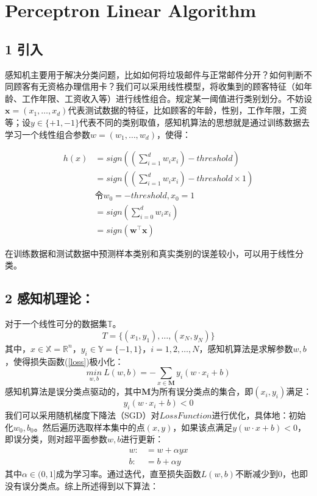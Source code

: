 \documentclass[twoside]{article}
\newcommand{\bx}{\mathbf{x}}
\begin{document}
\section*{Perceptron Linear Algorithm}
\subsection*{1 引入}
感知机主要用于解决分类问题，比如如何将垃圾邮件与正常邮件分开？如何判断不同顾客有无资格办理信用卡？我们可以采用线性模型，将收集到的顾客特征（如年龄、工作年限、工资收入等）进行线性组合。规定某一阈值进行类别划分。不妨设$\bx=(x_1,\ldots,x_d)$代表测试数据的特征，比如顾客的年龄，性别，工作年限，工资等；设$y \in \{+1,-1\}$代表不同的类别取值，感知机算法的思想就是通过训练数据去学习一个线性组合参数$w=(w_1,\ldots,w_d)$，使得：

\begin{equation*}
    \begin{aligned}
        h(x)&=sign\left(\left(\sum_{i=1}^d w_i x_i\right)-threshold\right)\\
        &=sign\left(\left(\sum_{i=1}^d w_i x_i\right)-threshold\times 1\right)\\
        &\text{令}w_0=-threshold,x_0=1\\
        &=sign\left(\sum_{i=0}^d w_i x_i\right)\\
        &=sign(\boldsymbol{w}^\top \boldsymbol{x})
    \end{aligned}
\end{equation*}

在训练数据和测试数据中预测样本类别和真实类别的误差较小，可以用于线性分类。
\subsection*{2 感知机理论：}
对于一个线性可分的数据集$\mathbb{T}$。
\begin{equation*}
T=\{(x_1,y_1),\ldots,(x_N,y_N)\}
\end{equation*}
其中，$x \in \mathbb{X}=\mathbb{R}^n$，$y_i \in \mathbb{Y}=\{-1,1\}\text{，}i=1,2,\ldots,N$，感知机算法是求解参数$w,b$，使得损失函数(\ref{loss})极小化：
\begin{equation}\label{loss}
\underset{w,b}{min}\ L(w,b)=- \sum_{x\in \mathbf{M}} y_i(w \cdot x_i+b) 
\end{equation}
感知机算法是误分类点驱动的，其中$\mathbf{M}$为所有误分类点的集合，即$(x_i,y_i)$满足：
$$y_i(w \cdot x_i+b)<0$$
我们可以采用随机梯度下降法（SGD）对$Loss Function$进行优化，具体地：初始化$w_0,b_0$。然后遍历选取样本集中的点$(x,y)$，如果该点满足$y(w \cdot x+b)<0$，即误分类，则对超平面参数$w,b$进行更新：
\begin{equation*}
\begin{aligned}
    w:&=w+\alpha yx\\
    b:&=b+\alpha y
\end{aligned}
\end{equation*}
其中$\alpha \in (0,1]$成为学习率。通过迭代，直至损失函数$L(w,b)$不断减少到0，也即没有误分类点。综上所述得到以下算法：
\end{document}
